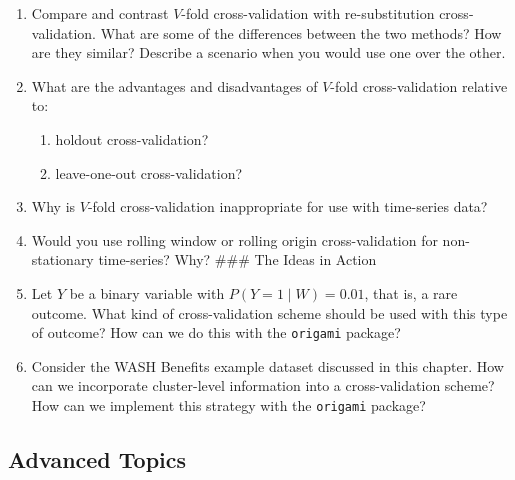 \documentclass[
  12pt, krantz2,
]{krantz}
\newcommand{\passthrough}[1]{#1}
\providecommand{\tightlist}{%
  \setlength{\itemsep}{0pt}\setlength{\parskip}{0pt}}
\newcommand{\1}{\mathbbm{1}}
\theoremstyle{definition}
\theoremstyle{definition}
\theoremstyle{definition}
\theoremstyle{definition}
\theoremstyle{remark}
\begin{document}
\begin{enumerate}
\def\labelenumi{\arabic{enumi}.}
\item
  Compare and contrast \(V\)-fold cross-validation with re-substitution
  cross-validation. What are some of the differences between the two methods?
  How are they similar? Describe a scenario when you would use one over the
  other.
\item
  What are the advantages and disadvantages of \(V\)-fold cross-validation
  relative to:

  \begin{enumerate}
  \def\labelenumii{\alph{enumii}.}
  \tightlist
  \item
    holdout cross-validation?
  \item
    leave-one-out cross-validation?
  \end{enumerate}
\item
  Why is \(V\)-fold cross-validation inappropriate for use with time-series data?
\item
  Would you use rolling window or rolling origin cross-validation for
  non-stationary time-series? Why?
  \#\#\# The Ideas in Action
\item
  Let \(Y\) be a binary variable with \(P(Y=1 \mid W) = 0.01\), that is, a rare
  outcome. What kind of cross-validation scheme should be used with this type
  of outcome? How can we do this with the \passthrough{\lstinline!origami!} package?
\item
  Consider the WASH Benefits example dataset discussed in this chapter. How can
  we incorporate cluster-level information into a cross-validation scheme? How
  can we implement this strategy with the \passthrough{\lstinline!origami!} package?
\end{enumerate}

\hypertarget{advanced-topics}{%
\subsection{Advanced Topics}\label{advanced-topics}}
\end{document}
